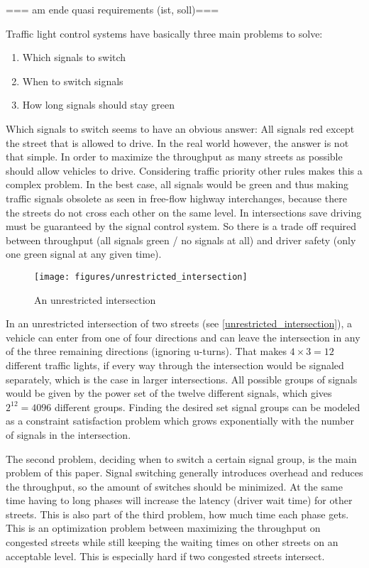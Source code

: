 === am ende quasi requirements (ist, soll)===

Traffic light control systems have basically three main problems to solve:

\begin{enumerate}
	\item Which signals to switch
	\item When to switch signals
	\item How long signals should stay green
\end{enumerate}

Which signals to switch seems to have an obvious answer: All signals red except the street that is allowed to drive. In the real world however, the answer is not that simple. In order to maximize the throughput as many streets as possible should allow vehicles to drive. Considering traffic priority other rules makes this a complex problem. In the best case, all signals would be green and thus making traffic signals obsolete as seen in free-flow highway interchanges, because there the streets do not cross each other on the same level. In intersections save driving must be guaranteed by the signal control system. So there is a trade off required between throughput (all signals green / no signals at all) and driver safety (only one green signal at any given time).

\begin{figure}[ht]
	\centering
	\texttt{[image: figures/unrestricted\_intersection]}
	\caption{An unrestricted intersection}
	\label{unrestricted_intersection}
\end{figure}

In an unrestricted intersection of two streets (see \autoref{unrestricted_intersection}), a vehicle can enter from one of four directions and can leave the intersection in any of the three remaining directions (ignoring u-turns). That makes $4 \times 3 = 12$ different traffic lights, if every way through the intersection would be signaled separately, which is the case in larger intersections. All possible groups of signals would be given by the power set of the twelve different signals, which gives $2^{12} = 4096$ different groups. Finding the desired set signal groups can be modeled as a constraint satisfaction problem which grows exponentially with the number of signals in the intersection.

The second problem, deciding when to switch a certain signal group, is the main problem of this paper. Signal switching generally introduces overhead and reduces the throughput, so the amount of switches should be minimized. At the same time having to long phases will increase the latency (driver wait time) for other streets. This is also part of the third problem, how much time each phase gets. This is an optimization problem between maximizing the throughput on congested streets while still keeping the waiting times on other streets on an acceptable level. This is especially hard if two congested streets intersect.


